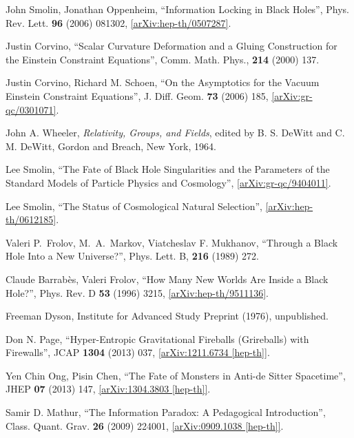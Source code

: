 \documentclass[12pt]{article}
\newcommand{\2}{$^2$}
\newcommand{\3}{$^3$}
\newcommand{\4}{$_4$}
\newcommand{\5}{$_5$}
\begin{document}
\begin{thebibliography}{400}
John Smolin, Jonathan Oppenheim, ``Information Locking in Black Holes'', Phys. Rev. Lett. \textbf{96} (2006) 081302, \href{http://arxiv.org/abs/hep-th/0507287}{[arXiv:hep-th/0507287]}.

 Justin Corvino, ``Scalar Curvature Deformation and a Gluing Construction for the Einstein Constraint Equations'', 
Comm. Math. Phys., \textbf{214} (2000) 137.

Justin Corvino, Richard M. Schoen, ``On the Asymptotics for the Vacuum Einstein Constraint Equations'',  J. Diff. Geom. \textbf{73} (2006) 185, \href{http://arxiv.org/abs/gr-qc/0301071}{[arXiv:gr-qc/0301071]}.



John A. Wheeler, \emph{Relativity, Groups, and Fields}, edited by B. S. DeWitt and C. M. DeWitt, Gordon and Breach, New York, 1964.

Lee Smolin, ``The Fate of Black Hole Singularities and the Parameters of the Standard Models of Particle Physics and Cosmology'',  \href{http://arxiv.org/abs/gr-qc/9404011}{[arXiv:gr-qc/9404011]}.


Lee Smolin, ``The Status of Cosmological Natural Selection'', \href{http://arxiv.org/abs/hep-th/0612185}{[arXiv:hep-th/0612185]}.

 Valeri P.~Frolov, M.~A.~Markov, Viatcheslav F. Mukhanov, ``Through a Black Hole Into a New Universe?'', Phys. Lett. B, \textbf{216} (1989) 272.

Claude Barrab\`es, Valeri Frolov, ``How Many New Worlds Are Inside a Black Hole?'', Phys. Rev. D \textbf{53} (1996) 3215, \href{http://arxiv.org/abs/hep-th/9511136v1}{[arXiv:hep-th/9511136]}.


Freeman Dyson, Institute for Advanced Study Preprint (1976), unpublished.

Don N. Page, ``Hyper-Entropic Gravitational Fireballs (Grireballs) with Firewalls'', JCAP \textbf{1304} (2013) 037, \href{http://arxiv.org/abs/1211.6734}{[arXiv:1211.6734 [hep-th]]}.


 Yen Chin Ong, Pisin Chen, ``The Fate of Monsters in Anti-de Sitter Spacetime'', JHEP \textbf{07} (2013) 147, \href{http://arxiv.org/abs/1304.3803}{[arXiv:1304.3803 [hep-th]]}.

Samir D. Mathur, ``The Information Paradox: A Pedagogical Introduction'', Class. Quant. Grav. \textbf{26} (2009) 224001, \href{http://arxiv.org/abs/0909.1038}{[arXiv:0909.1038 [hep-th]]}.


\end{thebibliography}
\end{document}

